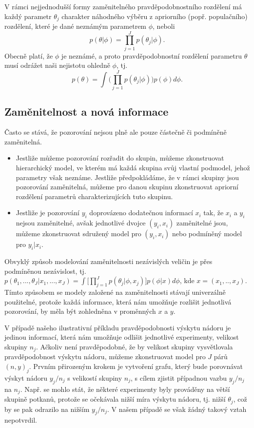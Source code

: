 V rámci nejjednodušší formy zaměnitelného pravděpodobnostního rozdělení má každý parametr $\theta_j$ charakter náhodného výběru z apriorního (popř. populačního) rozdělení, které je dané neznámým parametrem $\phi$, neboli
\begin{equation}
p(\theta|\phi) = \prod_{j = 1}^J p(\theta_j | \phi).
\end{equation}
Obecně platí, že $\phi$ je neznámé, a proto pravděpodobnostní rozdělení parametru $\theta$ musí odrážet naši nejistotu ohledně $\phi$, tj.
\begin{equation}
p(\theta) = \int \Big(\prod_{j = 1}^J p(\theta_j | \phi) \Big) p(\phi) d\phi.
\end{equation}

\subsection{Zaměnitelnost a nová informace}

Často se stává, že pozorování nejsou plně ale pouze částečně či podmíněně zaměnitelná.
\begin{itemize}
\item Jestliže můžeme pozorování rozřadit do skupin, můžeme zkonstruovat hierarchický model, ve kterém má každá skupina svůj vlastní podmodel, jehož parametry však neznáme. Jestliže předpokládáme, že v rámci skupiny jsou pozorování zaměnitelná, můžeme pro danou skupinu zkonstruovat apriorní rozdělení parametrů charakterizujících tuto skupinu.
\item Jestliže je pozorování $y_i$ doprovázeno dodatečnou informací $x_i$ tak, že $x_i$ a $y_i$ nejsou zaměnitelné, avšak jednotlivé dvojce $(y_i, x_i)$ zaměnitelné jsou, můžeme zkonstruovat sdružený model pro $(y_i, x_i)$ nebo podmíněný model pro $y_i|x_i$.
\end{itemize}

Obvyklý způsob modelování zaměnitelnosti nezávislých veličin je přes podmíněnou nezávislost, tj. $p(\theta_1, ..., \theta_J|x_1, ..., x_J) = \int \Big[\prod_{j = 1}^J p(\theta_j | \phi, x_j)\Big]p(\phi|x)d\phi$, kde $x = (x_1, .., x_J)$. Tímto způsobem se modely založené na zaměnitelnosti stávají univerzálně použitelné, protože každá informace, která nám umožňuje rozlišit jednotlivá pozorování, by měla být zohledněna v proměnných $x$ a $y$.

V případě našeho ilustrativní příkladu pravděpodobnosti výskytu nádoru je jedinou informací, která nám umožňuje odlišit jednotlivé experimenty, velikost skupiny $n_j$. Ačkoliv není pravděpodobné, že by velikost skupiny vysvětlovala pravděpodobnost výskytu nádoru, můžeme zkonstruovat model pro $J$ párů $(n, y)_j$. Prvním přirozeným krokem je vytvoření grafu, který bude porovnávat výskyt nádoru $y_j / n_j$ s velikostí skupiny $n_j$, s cílem zjistit případnou vazbu $y_j / n_j$ na $n_j$. Např. se mohlo stát, že některé experimenty byly prováděny na větší skupině potkanů, protože se očekávala nižší míra výskytu nádoru, tj. nižší $\theta_j$, což by se pak odrazilo na nižším $y_j / n_j$. V našem případě se však žádný takový vztah nepotvrdil.

